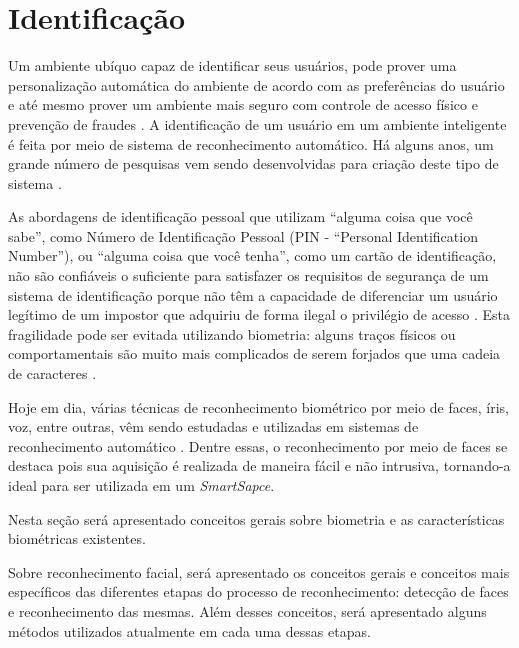 	

\section{Identificação}
	
	Um ambiente ubíquo capaz de identificar seus usuários, pode prover uma
	personalização automática do ambiente de acordo com as preferências do usuário e
	até mesmo prover um ambiente mais seguro com controle de acesso físico e
	prevenção de fraudes \cite{saocarlos}. A identificação de um usuário em um
	ambiente inteligente é feita por meio de sistema de reconhecimento automático.
	Há alguns anos, um grande número de pesquisas vem sendo desenvolvidas para criação
	deste tipo de sistema  \cite{saocarlos}.
	
	As abordagens de identificação pessoal que utilizam ``alguma coisa que você
	sabe'', como Número de Identificação Pessoal (PIN - ``Personal Identification
	Number''), ou ``alguma coisa que você tenha'', como um cartão de identificação,
	não são confiáveis o suficiente para satisfazer os requisitos de segurança de um
	sistema de identificação porque não têm a capacidade de diferenciar um usuário
	legítimo de um impostor que adquiriu de forma ilegal o privilégio de acesso
	\cite{hong}. Esta fragilidade pode ser evitada utilizando biometria: alguns
	traços físicos ou comportamentais são muito mais complicados de serem forjados
	que uma cadeia de caracteres \cite{drovetto}.
	
	Hoje em dia, várias técnicas de reconhecimento biométrico por meio de faces,
	íris, voz, entre outras, vêm sendo estudadas e utilizadas em sistemas de
	reconhecimento automático \cite{bolle}. Dentre essas, o reconhecimento por meio
	de faces se destaca pois sua aquisição é realizada de maneira fácil e não
	intrusiva, tornando-a ideal para ser utilizada em um \textit{SmartSapce}.
	
	Nesta seção será apresentado conceitos gerais sobre biometria e as
	características biométricas existentes.
	
	Sobre reconhecimento facial, será apresentado os conceitos gerais e conceitos
	mais específicos das diferentes etapas do processo de reconhecimento: detecção
	de faces e reconhecimento das mesmas. Além desses conceitos, será apresentado
	alguns métodos utilizados atualmente em cada uma dessas etapas.


	
	





























